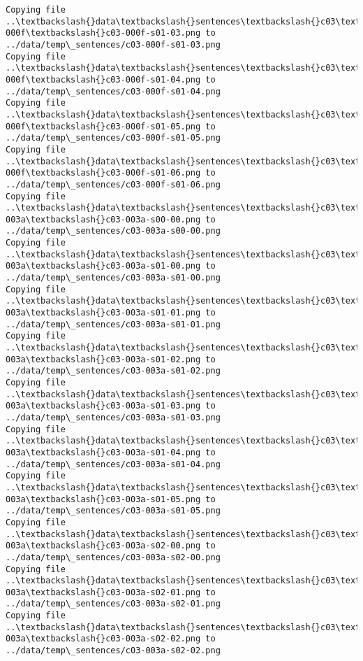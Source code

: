 \documentclass[11pt]{article}
\begin{document}
\begin{Verbatim}[commandchars=\\\{\}]
Copying file ..\textbackslash{}data\textbackslash{}sentences\textbackslash{}c03\textbackslash{}c03-000f\textbackslash{}c03-000f-s01-03.png to
../data/temp\_sentences/c03-000f-s01-03.png
Copying file ..\textbackslash{}data\textbackslash{}sentences\textbackslash{}c03\textbackslash{}c03-000f\textbackslash{}c03-000f-s01-04.png to
../data/temp\_sentences/c03-000f-s01-04.png
Copying file ..\textbackslash{}data\textbackslash{}sentences\textbackslash{}c03\textbackslash{}c03-000f\textbackslash{}c03-000f-s01-05.png to
../data/temp\_sentences/c03-000f-s01-05.png
Copying file ..\textbackslash{}data\textbackslash{}sentences\textbackslash{}c03\textbackslash{}c03-000f\textbackslash{}c03-000f-s01-06.png to
../data/temp\_sentences/c03-000f-s01-06.png
Copying file ..\textbackslash{}data\textbackslash{}sentences\textbackslash{}c03\textbackslash{}c03-003a\textbackslash{}c03-003a-s00-00.png to
../data/temp\_sentences/c03-003a-s00-00.png
Copying file ..\textbackslash{}data\textbackslash{}sentences\textbackslash{}c03\textbackslash{}c03-003a\textbackslash{}c03-003a-s01-00.png to
../data/temp\_sentences/c03-003a-s01-00.png
Copying file ..\textbackslash{}data\textbackslash{}sentences\textbackslash{}c03\textbackslash{}c03-003a\textbackslash{}c03-003a-s01-01.png to
../data/temp\_sentences/c03-003a-s01-01.png
Copying file ..\textbackslash{}data\textbackslash{}sentences\textbackslash{}c03\textbackslash{}c03-003a\textbackslash{}c03-003a-s01-02.png to
../data/temp\_sentences/c03-003a-s01-02.png
Copying file ..\textbackslash{}data\textbackslash{}sentences\textbackslash{}c03\textbackslash{}c03-003a\textbackslash{}c03-003a-s01-03.png to
../data/temp\_sentences/c03-003a-s01-03.png
Copying file ..\textbackslash{}data\textbackslash{}sentences\textbackslash{}c03\textbackslash{}c03-003a\textbackslash{}c03-003a-s01-04.png to
../data/temp\_sentences/c03-003a-s01-04.png
Copying file ..\textbackslash{}data\textbackslash{}sentences\textbackslash{}c03\textbackslash{}c03-003a\textbackslash{}c03-003a-s01-05.png to
../data/temp\_sentences/c03-003a-s01-05.png
Copying file ..\textbackslash{}data\textbackslash{}sentences\textbackslash{}c03\textbackslash{}c03-003a\textbackslash{}c03-003a-s02-00.png to
../data/temp\_sentences/c03-003a-s02-00.png
Copying file ..\textbackslash{}data\textbackslash{}sentences\textbackslash{}c03\textbackslash{}c03-003a\textbackslash{}c03-003a-s02-01.png to
../data/temp\_sentences/c03-003a-s02-01.png
Copying file ..\textbackslash{}data\textbackslash{}sentences\textbackslash{}c03\textbackslash{}c03-003a\textbackslash{}c03-003a-s02-02.png to
../data/temp\_sentences/c03-003a-s02-02.png

\end{Verbatim}
\end{document}
